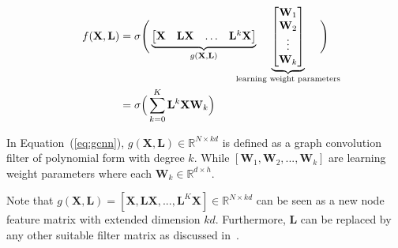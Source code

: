 \documentclass{article}
\begin{document}
\vspace{-1em}
\begin{equation}\label{eq:gcnn}
\begin{split}
f(\mathbf{X}, \mathbf{L}) &  = \sigma\Bigg( 
\underbrace{ \begin{bmatrix} \mathbf{X} & \mathbf{L} \mathbf{X} & \dots &\mathbf{L}^k \mathbf{X} \end{bmatrix}}_{{g(\mathbf{X}, \mathbf{L})}} \hspace{-2em}  \underbrace{  \begin{bmatrix}
	\mathbf{W}_1   \\
	\mathbf{W}_2   \\
	\vdots \\
	\mathbf{W}_k   \\
	\end{bmatrix}}_{\text{learning weight parameters}}\hspace{-2em}  \Bigg)\\  
& = \sigma\Big(\sum_{k=0}^{K} \mathbf{L}^{k}\mathbf{X}\mathbf{W}_k \Big)\\
\end{split}
\end{equation}


 
In Equation~(\ref{eq:gcnn}),  $g(\mathbf{X},\mathbf{L}) \in \mathbb{R}^{N \times k   d} $ is defined as a graph convolution filter of polynomial form with degree $k$. While $[\mathbf{W}_1, \mathbf{W}_2,  ..., \mathbf{W}_k]$ are learning weight parameters where each $\mathbf{W}_k \in \mathbb{R}^{d \times h}$. 

Note that $g(\mathbf{X}, \mathbf{L})=[\mathbf{X}, \mathbf{L}\mathbf{X},..., \mathbf{L}^{K}\mathbf{X}] \in \mathbb{R}^{N \times k  d}$  can be seen as a new node feature matrix with extended dimension $kd$\footnotemark\label{fnm:1}. Furthermore, $\mathbf{L}$  can be replaced by any other suitable filter matrix as discussed in~\cite{levie2017cayleynets, kipf2016semi}.
\end{document}
